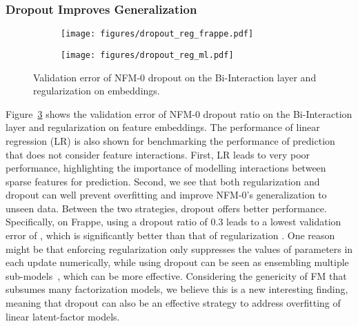 \subsubsection{\textbf{Dropout Improves Generalization}}
\label{ss:exper_dropout}
\begin{figure}[t]
	\centering
	\begin{subfigure}[b]{0.24\textwidth}
		\centering
		\texttt{[image: figures/dropout\_reg\_frappe.pdf]}
		\vspace{-18pt}
\label{fig:dropout_reg_frappe}
	\end{subfigure} \hspace{-7pt}
	\begin{subfigure}[b]{0.24\textwidth}
		\centering
		\texttt{[image: figures/dropout\_reg\_ml.pdf]}
		\vspace{-18pt}
\label{fig:dropout_reg_ml}
	\end{subfigure} \hspace{-7pt}
	\caption{Validation error of NFM-0 \wrt dropout on the Bi-Interaction layer and  regularization on embeddings.}
	\vspace{-15pt}
	\label{fig:dropout_reg}
\end{figure}

Figure~\ref{fig:dropout_reg} shows the validation error of NFM-0 \wrt dropout ratio on the Bi-Interaction layer and  regularization on feature embeddings. The performance of linear regression (LR) is also shown for benchmarking the performance of prediction that does not consider feature interactions. 
First, LR leads to very poor performance, highlighting the importance of modelling interactions between sparse features for prediction. 
Second, we see that both  regularization and dropout can well prevent overfitting and improve NFM-0's generalization to unseen data. 
Between the two strategies, dropout offers better performance. Specifically, on Frappe, using a dropout ratio of 0.3 leads to a lowest validation error of , which is significantly better than that of  regularization .
One reason might be that enforcing  regularization only suppresses the values of parameters in each update numerically, while using dropout can be seen as ensembling multiple sub-models~\cite{srivastava2014dropout}, which can be more effective. 
Considering the genericity of FM that subsumes many factorization models, we believe this is a new interesting finding, meaning that dropout can also be an effective strategy to address overfitting of linear latent-factor models. 


